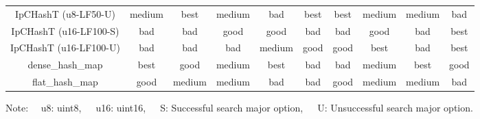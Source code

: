 \begin{table}
\begin{center}
\begin{tabular}{c|c|ccc|ccc|c|c}
        IpCHashT (u8-LF50-U)   & \cellcolor{cMedi}medium & \cellcolor{cBest}best   & \cellcolor{cMedi}medium & \cellcolor{cBad }bad    & \cellcolor{cBest}best   & \cellcolor{cBest}best   & \cellcolor{cMedi}medium  & \cellcolor{cMedi}medium & \cellcolor{cBad }bad  \rule[0pt]{0pt}{15pt} \\
        IpCHashT (u16-LF100-S) & \cellcolor{cBad }bad    & \cellcolor{cBad }bad    & \cellcolor{cGood}good   & \cellcolor{cGood}good   & \cellcolor{cBad }bad    & \cellcolor{cBad }bad    & \cellcolor{cGood}good    & \cellcolor{cBad }bad    & \cellcolor{cBest}best \rule[0pt]{0pt}{15pt} \\
        IpCHashT (u16-LF100-U) & \cellcolor{cBad }bad    & \cellcolor{cBad }bad    & \cellcolor{cBad }bad    & \cellcolor{cMedi}medium & \cellcolor{cGood}good   & \cellcolor{cGood}good   & \cellcolor{cBest}best    & \cellcolor{cBad }bad    & \cellcolor{cBest}best \rule[0pt]{0pt}{15pt} \\
        dense\_hash\_map       & \cellcolor{cBest}best   & \cellcolor{cGood}good   & \cellcolor{cMedi}medium & \cellcolor{cBest}best   & \cellcolor{cBad }bad    & \cellcolor{cBad }bad    & \cellcolor{cMedi}medium  & \cellcolor{cBest}best   & \cellcolor{cGood}good \rule[0pt]{0pt}{15pt} \\
        flat\_hash\_map        & \cellcolor{cGood}good   & \cellcolor{cMedi}medium & \cellcolor{cMedi}medium & \cellcolor{cBad }bad    & \cellcolor{cBad }bad    & \cellcolor{cGood}good   & \cellcolor{cMedi}medium  & \cellcolor{cMedi}medium & \cellcolor{cBad }bad  \rule[0pt]{0pt}{15pt} \\ \hline
    \end{tabular}
    Note: \ \ u8: uint8,\ \ \ u16: uint16,\ \ \ S: Successful search major option,\ \ \ U: Unsuccessful search major option.
    \label{table_hashT_cmp}
  \end{center}
\end{table}

